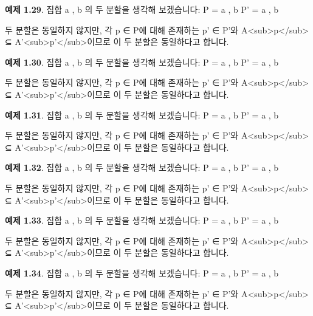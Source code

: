 \documentclass[11pt, a4paper, twoside, openany]{book}
\begin{document}
\par\medskip
\textbf{예제 1.29}. 집합 { a , b }의 두 분할을 생각해 보겠습니다:
P = { { a } , { b } }
P' = { { a , b } }

\par\medskip
두 분할은 동일하지 않지만, 각 p ∈ P\hspace{0pt}에 대해 존재하는 p' ∈ P'와 A<sub>p</sub> ⊆ A'<sub>p'</sub>이므로 이 두 분할은 동일하다고 합니다.

\par\medskip
\textbf{예제 1.30}. 집합 { a , b }의 두 분할을 생각해 보겠습니다:
P = { { a } , { b } }
P' = { { a , b } }

\par\medskip
두 분할은 동일하지 않지만, 각 p ∈ P\hspace{0pt}에 대해 존재하는 p' ∈ P'와 A<sub>p</sub> ⊆ A'<sub>p'</sub>이므로 이 두 분할은 동일하다고 합니다.

\par\medskip
\textbf{예제 1.31}. 집합 { a , b }의 두 분할을 생각해 보겠습니다:
P = { { a } , { b } }
P' = { { a , b } }

\par\medskip
두 분할은 동일하지 않지만, 각 p ∈ P\hspace{0pt}에 대해 존재하는 p' ∈ P'와 A<sub>p</sub> ⊆ A'<sub>p'</sub>이므로 이 두 분할은 동일하다고 합니다.

\par\medskip
\textbf{예제 1.32}. 집합 { a , b }의 두 분할을 생각해 보겠습니다:
P = { { a } , { b } }
P' = { { a , b } }

\par\medskip
두 분할은 동일하지 않지만, 각 p ∈ P\hspace{0pt}에 대해 존재하는 p' ∈ P'와 A<sub>p</sub> ⊆ A'<sub>p'</sub>이므로 이 두 분할은 동일하다고 합니다.

\par\medskip
\textbf{예제 1.33}. 집합 { a , b }의 두 분할을 생각해 보겠습니다:
P = { { a } , { b } }
P' = { { a , b } }

\par\medskip
두 분할은 동일하지 않지만, 각 p ∈ P\hspace{0pt}에 대해 존재하는 p' ∈ P'와 A<sub>p</sub> ⊆ A'<sub>p'</sub>이므로 이 두 분할은 동일하다고 합니다.

\par\medskip
\textbf{예제 1.34}. 집합 { a , b }의 두 분할을 생각해 보겠습니다:
P = { { a } , { b } }
P' = { { a , b } }

\par\medskip
두 분할은 동일하지 않지만, 각 p ∈ P\hspace{0pt}에 대해 존재하는 p' ∈ P'와 A<sub>p</sub> ⊆ A'<sub>p'</sub>이므로 이 두 분할은 동일하다고 합니다.
\end{document}
